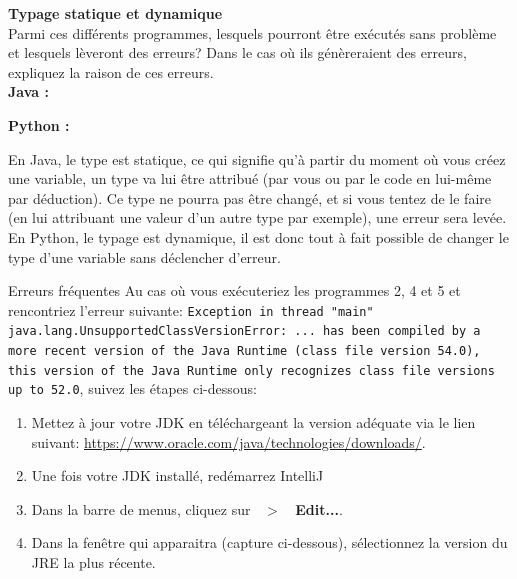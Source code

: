 \begin{Exercice}[10 minutes]  \textbf{Typage statique et dynamique}\\
    
    Parmi ces différents programmes, lesquels pourront être exécutés sans problème et lesquels lèveront des erreurs? Dans le cas où ils génèreraient des erreurs, expliquez la raison de ces erreurs.\\
    
    \textbf{Java :}
    
     
    
    \textbf{Python :}
    
     
    

    \begin{conseil}
    
        En Java, le type est statique, ce qui signifie qu'à partir du moment où vous créez une variable, un type va lui être attribué (par vous ou par le code en lui-même par déduction). Ce type ne pourra pas être changé, et si vous tentez de le faire (en lui attribuant une valeur d'un autre type par exemple), une erreur sera levée. \\

En Python, le typage est dynamique, il est donc tout à fait possible de changer le type d'une variable sans déclencher d'erreur. \\

    \end{conseil}

    \begin{Example}{\faTriangleExclamation \quad Erreurs fréquentes}
        Au cas où vous exécuteriez les programmes 2, 4 et 5 et rencontriez l'erreur suivante: \lstinline{Exception in thread "main" java.lang.UnsupportedClassVersionError: ... has been compiled by a more recent version of the Java Runtime (class file version 54.0), this version of the Java Runtime only recognizes class file versions up to 52.0}, suivez les étapes ci-dessous:
        \begin{enumerate}
            \item Mettez à jour votre JDK en téléchargeant la version adéquate via le lien suivant: \url{https://www.oracle.com/java/technologies/downloads/}.
            \item Une fois votre JDK installé, redémarrez IntelliJ
            \item Dans la barre de menus, cliquez sur \textbf{\faEllipsisVertical \ $>$ \ Edit...}.
            \item Dans la fenêtre qui apparaitra (capture ci-dessous), sélectionnez la version du JRE la plus récente.
        \end{enumerate}
        

\end{Example}
\end{Exercice}
